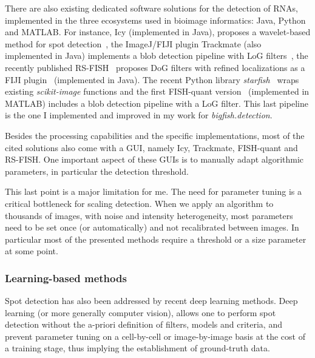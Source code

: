 There are also existing dedicated software solutions for the detection of RNAs, implemented in the three ecosystems used in bioimage informatics: Java, Python and MATLAB.
For instance, Icy (implemented in Java), proposes a wavelet-based method for spot detection~\cite{de_chaumont_icy_2012}, the ImageJ/FIJI plugin Trackmate (also implemented in Java) implements a blob detection pipeline with \ac{LoG} filters~\cite{ershov_trackmate_2022}, the recently published RS-FISH~\cite{bahry_rs-fish_2021} proposes \ac{DoG} filters with refined localizations as a FIJI plugin~\cite{schindelin_fiji_2012} (implemented in Java).
The recent Python library \emph{starfish}~\cite{perkel_starfish_2019} wraps existing \emph{scikit-image} functions and the first FISH-quant version~\cite{mueller_fish-quant_2013} (implemented in MATLAB) includes a blob detection pipeline with a \ac{LoG} filter.
This last pipeline is the one I implemented and improved in my work for \emph{bigfish.detection}.

Besides the processing capabilities and the specific implementations, most of the cited solutions also come with a \ac{GUI}, namely Icy, Trackmate, FISH-quant and RS-FISH.
One important aspect of these \ac{GUI}s is to manually adapt algorithmic parameters, in particular the detection threshold.

This last point is a major limitation for me.
The need for parameter tuning is a critical bottleneck for scaling detection.
When we apply an algorithm to thousands of images, with noise and intensity heterogeneity, most parameters need to be set once (or automatically) and not recalibrated between images.
In particular most of the presented methods require a threshold or a size parameter at some point.

\subsubsection{Learning-based methods}

Spot detection has also been addressed by recent deep learning methods.
Deep learning (or more generally computer vision), allows one to perform spot detection without the a-priori definition of filters, models and criteria, and prevent parameter tuning on a cell-by-cell or image-by-image basis at the cost of a training stage, thus implying the establishment of ground-truth data.

